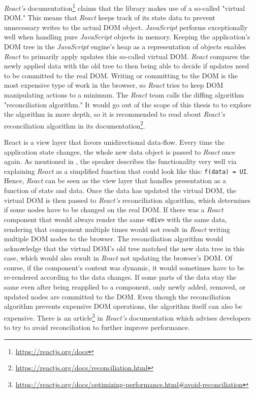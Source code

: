 \emph{React's} documentation\footnote{\url{https://reactjs.org/docs}} claims that the library makes use of a so-called "virtual DOM." This means that \emph{React} keeps track of its state data to prevent unnecessary writes to the actual DOM object. \emph{JavaScript} performs exceptionally well when handling pure \emph{JavaScript} objects in memory. Keeping the application's DOM tree in the \emph{JavaScript} engine's heap as a representation of objects enables \emph{React} to primarily apply updates this so-called virtual DOM. \emph{React} compares the newly applied data with the old tree to then being able to decide if updates need to be committed to the real DOM. Writing or committing to the DOM is the most expensive type of work in the browser, so \emph{React} tries to keep DOM manipulating actions to a minimum. The \emph{React} team calls the diffing algorithm "reconciliation algorithm." It would go out of the scope of this thesis to to explore the algorithm in more depth, so it is recommended to read about \emph{React's} reconciliation algorithm in its documentation\footnote{\url{https://reactjs.org/docs/reconciliation.html}}.

React is a view layer that favors unidirectional data-flow. Every time the application state changes, the whole new data object is passed to \emph{React} once again. As mentioned in \cite[6:50]{ReactFoundingVideo}, the speaker describes the functionality very well via explaining \emph{React} as a simplified function that could look like this: \texttt{f(data) = UI}. Hence, \emph{React} can be seen as the view layer that handles presentation as a function of state and data. Once the data has updated the virtual DOM, the virtual DOM is then passed to \emph{React's} reconciliation algorithm, which determines if some nodes have to be changed on the real DOM. If there was a \emph{React} component that would always render the same \texttt{<div>} with the same data, rendering that component multiple times would not result in \emph{React} writing multiple DOM nodes to the browser. The reconciliation algorithm would acknowledge that the virtual DOM's old tree matched the new data tree in this case, which would also result in \emph{React} not updating the browser's DOM. Of course, if the component's content was dynamic, it would sometimes have to be re-rendered according to the data changes. If some parts of the data stay the same even after being reapplied to a component, only newly added, removed, or updated nodes are committed to the DOM. Even though the reconciliation algorithm prevents expensive DOM operations, the algorithm itself can also be expensive. There is an article\footnote{\url{https://reactjs.org/docs/optimizing-performance.html\#avoid-reconciliation}} in \emph{React's} documentation which advises developers to try to avoid reconciliation to further improve performance.

